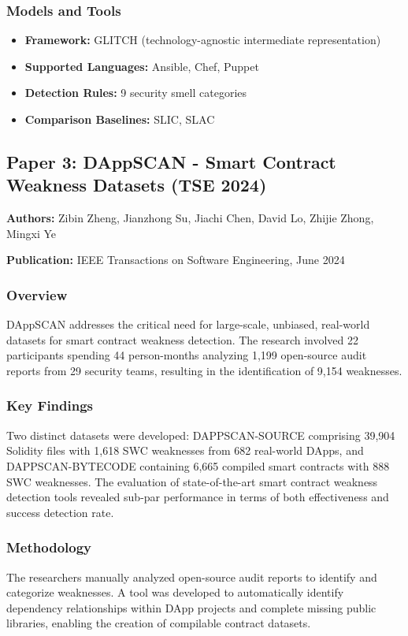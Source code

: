 \documentclass[11pt,a4paper]{article}
\begin{document}
\subsubsection{Models and Tools}
\begin{itemize}
    \item \textbf{Framework:} GLITCH (technology-agnostic intermediate representation)
    \item \textbf{Supported Languages:} Ansible, Chef, Puppet
    \item \textbf{Detection Rules:} 9 security smell categories
    \item \textbf{Comparison Baselines:} SLIC, SLAC
\end{itemize}

\subsection{Paper 3: DAppSCAN - Smart Contract Weakness Datasets (TSE 2024)}

\textbf{Authors:} Zibin Zheng, Jianzhong Su, Jiachi Chen, David Lo, Zhijie Zhong, Mingxi Ye

\textbf{Publication:} IEEE Transactions on Software Engineering, June 2024

\subsubsection{Overview}
DAppSCAN addresses the critical need for large-scale, unbiased, real-world datasets for smart contract weakness detection. The research involved 22 participants spending 44 person-months analyzing 1,199 open-source audit reports from 29 security teams, resulting in the identification of 9,154 weaknesses.

\subsubsection{Key Findings}
Two distinct datasets were developed: DAPPSCAN-SOURCE comprising 39,904 Solidity files with 1,618 SWC weaknesses from 682 real-world DApps, and DAPPSCAN-BYTECODE containing 6,665 compiled smart contracts with 888 SWC weaknesses. The evaluation of state-of-the-art smart contract weakness detection tools revealed sub-par performance in terms of both effectiveness and success detection rate.

\subsubsection{Methodology}
The researchers manually analyzed open-source audit reports to identify and categorize weaknesses. A tool was developed to automatically identify dependency relationships within DApp projects and complete missing public libraries, enabling the creation of compilable contract datasets.
\end{document}
